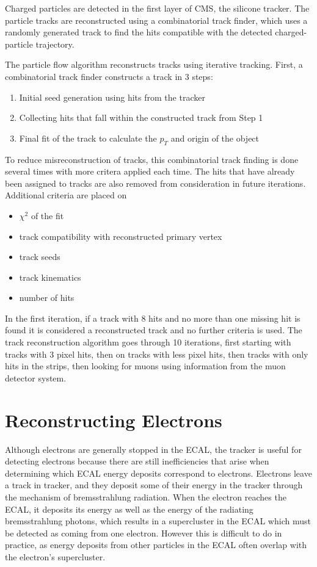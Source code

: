 Charged particles are detected in the first layer of CMS, the silicone tracker. The particle tracks are reconstructed using a combinatorial track finder, which uses a randomly generated track to find the hits compatible with the detected charged-particle trajectory. 


The particle flow algorithm reconstructs tracks using iterative tracking. First, a combinatorial track finder constructs a track in 3 steps:

\begin{enumerate}
	\item Initial seed generation using hits from the tracker
	\item Collecting hits that fall within the constructed track from Step 1
	\item Final fit of the track to calculate the $p_T$ and origin of the object
\end{enumerate}


To reduce misreconstruction of tracks, this combinatorial track finding is done several times with more critera applied each time. The hits that have already been assigned to tracks are also removed from consideration in future iterations. Additional criteria are placed on 

\begin{itemize}
	\item $\chi^2$ of the fit
	\item track compatibility with reconstructed primary vertex
	\item track seeds
	\item track kinematics
	\item number of hits
\end{itemize}

In the first iteration, if a track with 8 hits and no more than one missing hit is found it is considered a reconstructed track and no further criteria is used. The track reconstruction algorithm goes through 10 iterations, first starting with tracks with 3 pixel hits, then on tracks with less pixel hits, then tracks with only hits in the strips, then looking for muons using information from the muon detector system.

\section{Reconstructing Electrons}

Although electrons are generally stopped in the ECAL, the tracker is useful for detecting electrons because there are still inefficiencies that arise when determining which ECAL energy deposits correspond to electrons. Electrons leave a track in tracker, and they deposit some of their energy in the tracker through the mechanism of bremsstrahlung radiation. When the electron reaches the ECAL, it deposits its energy as well as the energy of the radiating bremsstrahlung photons, which results in a supercluster in the ECAL which must be detected as coming from one electron. However this is difficult to do in practice, as energy deposits from other particles in the ECAL often overlap with the electron’s supercluster.


